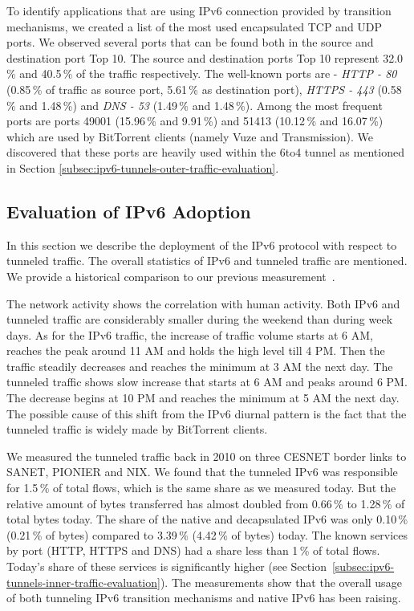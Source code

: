 To identify applications that are using IPv6 connection provided by transition mechanisms, we created a list of the most used encapsulated TCP and UDP ports. We observed several ports that can be found both in the source and destination port Top 10. The source and destination ports Top 10 represent 32.0\,\% and 40.5\,\% of the traffic respectively. The well-known ports are - \emph{HTTP - 80} (0.85\,\% of traffic as source port, 5.61\,\% as destination port), \emph{HTTPS - 443} (0.58\,\% and 1.48\,\%) and \emph{DNS - 53} (1.49\,\% and 1.48\,\%). Among the most frequent ports are ports 49001 (15.96\,\% and 9.91\,\%) and 51413 (10.12\,\% and 16.07\,\%) which are used by BitTorrent clients (namely Vuze
and Transmission). We discovered that these ports are heavily used within the 6to4 tunnel as mentioned in Section \ref{subsec:ipv6-tunnels-outer-traffic-evaluation}.

\subsection{Evaluation of IPv6 Adoption} \label{subsec:ipv6-tunnels-evaluation-of-ipv6}

In this section we describe the deployment of the IPv6 protocol with respect to tunneled traffic. The overall statistics of IPv6 and tunneled traffic are mentioned. We provide a historical comparison to our previous measurement~\cite{elich}. 

The network activity shows the correlation with human activity. Both IPv6 and tunneled traffic are considerably smaller during the weekend than during week days. As for the IPv6 traffic, the increase of traffic volume starts at 6 AM, reaches the peak around 11 AM and holds the high level till 4 PM. Then the traffic steadily decreases and reaches the minimum at 3 AM the next day. The tunneled traffic shows slow increase that starts at 6 AM and peaks around 6 PM. The decrease begins at 10 PM and reaches the minimum at 5 AM the next day. The possible cause of this shift from the IPv6 diurnal pattern is the fact that the tunneled traffic is widely made by BitTorrent clients.

We measured the tunneled traffic back in 2010 on three CESNET border links to SANET, PIONIER and NIX. We found that the tunneled IPv6 was responsible for 1.5\,\% of total flows, which is the same share as we measured today. But the relative amount of bytes transferred has almost doubled from 0.66\,\% to 1.28\,\% of total bytes today. The share of the native and decapsulated IPv6 was only 0.10\,\% (0.21\,\% of bytes) compared to 3.39\,\% (4.42\,\% of bytes) today. The known services by port (HTTP, HTTPS and DNS) had a share less than 1\,\% of total flows. Today's share of these services is significantly higher (see Section~\ref{subsec:ipv6-tunnels-inner-traffic-evaluation}). The measurements show that the overall usage of both tunneling IPv6 transition mechanisms and native IPv6 has been raising.

